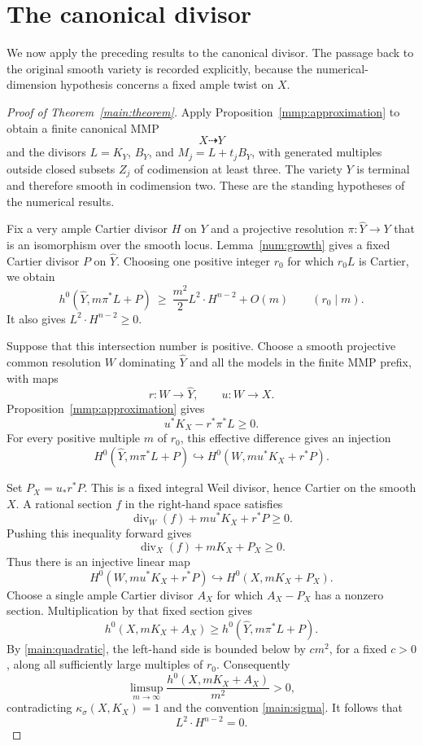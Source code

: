 \section{The canonical divisor}
\label{main:proof-section}

We now apply the preceding results to the canonical divisor. The passage back to the original smooth variety is recorded explicitly, because the numerical-dimension hypothesis concerns a fixed ample twist on \(X\).

\begin{proof}[Proof of Theorem~\ref{main:theorem}]
Apply Proposition~\ref{mmp:approximation} to obtain a finite canonical MMP
\[
X\dashrightarrow Y
\]
and the divisors \(L=K_Y\), \(B_Y\), and \(M_j=L+t_jB_Y\), with generated multiples outside closed subsets \(Z_j\) of codimension at least three. The variety \(Y\) is terminal and therefore smooth in codimension two. These are the standing hypotheses of the numerical results.

Fix a very ample Cartier divisor \(H\) on \(Y\) and a projective resolution \(\pi:\widehat Y\to Y\) that is an isomorphism over the smooth locus. Lemma~\ref{num:growth} gives a fixed Cartier divisor \(P\) on \(\widehat Y\). Choosing one positive integer \(r_0\) for which \(r_0L\) is Cartier, we obtain
\begin{equation}\label{main:quadratic}
h^0(\widehat Y,m\pi^*L+P)
\ \ge\ \frac{m^2}{2}L^2\cdot H^{n-2}+O(m)
\qquad (r_0\mid m).
\end{equation}
It also gives \(L^2\cdot H^{n-2}\ge0\).

Suppose that this intersection number is positive. Choose a smooth projective common resolution \(W\) dominating \(\widehat Y\) and all the models in the finite MMP prefix, with maps
\[
r:W\longrightarrow\widehat Y,\qquad u:W\longrightarrow X.
\]
Proposition~\ref{mmp:approximation} gives
\[
u^*K_X-r^*\pi^*L\ge0.
\]
For every positive multiple \(m\) of \(r_0\), this effective difference gives an injection
\[
H^0(\widehat Y,m\pi^*L+P)
\hookrightarrow H^0(W,mu^*K_X+r^*P).
\]

Set \(P_X=u_*r^*P\). This is a fixed integral Weil divisor, hence Cartier on the smooth \(X\). A rational section \(f\) in the right-hand space satisfies
\[
\operatorname{div}_W(f)+mu^*K_X+r^*P\ge0.
\]
Pushing this inequality forward gives
\[
\operatorname{div}_X(f)+mK_X+P_X\ge0.
\]
Thus there is an injective linear map
\[
H^0(W,mu^*K_X+r^*P)
\hookrightarrow H^0(X,mK_X+P_X).
\]
Choose a single ample Cartier divisor \(A_X\) for which \(A_X-P_X\) has a nonzero section. Multiplication by that fixed section gives
\[
h^0(X,mK_X+A_X)\ge h^0(\widehat Y,m\pi^*L+P).
\]
By \eqref{main:quadratic}, the left-hand side is bounded below by \(cm^2\), for a fixed \(c>0\), along all sufficiently large multiples of \(r_0\). Consequently
\[
\limsup_{m\to\infty}\frac{h^0(X,mK_X+A_X)}{m^2}>0,
\]
contradicting \(\kappa_\sigma(X,K_X)=1\) and the convention \eqref{main:sigma}. It follows that
\[
L^2\cdot H^{n-2}=0.
\]


\end{proof}
